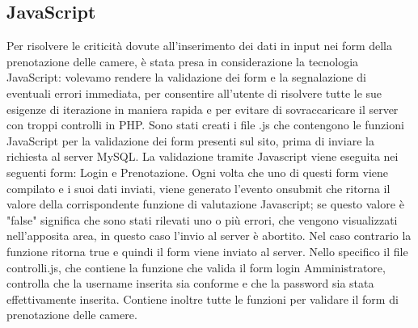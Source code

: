 \subsection{JavaScript}
Per risolvere le criticità dovute all'inserimento dei dati in input nei form della prenotazione delle camere, è stata presa in considerazione la tecnologia JavaScript: volevamo rendere la validazione dei form e la segnalazione di eventuali errori immediata, per consentire all'utente di risolvere tutte le sue esigenze di iterazione in maniera rapida e per evitare di sovraccaricare il server con troppi controlli in PHP.
Sono stati creati i file .js che contengono le funzioni JavaScript per la validazione dei form presenti sul sito, prima di inviare la richiesta al server MySQL. La validazione tramite Javascript viene eseguita nei seguenti form: Login e Prenotazione. Ogni volta che uno di questi form viene compilato e i suoi dati inviati, viene generato l'evento onsubmit che ritorna il valore della corrispondente funzione di valutazione Javascript; se questo valore è "false" significa che sono stati rilevati uno o più errori, che vengono visualizzati nell'apposita area, in questo caso l'invio al server è abortito. Nel caso contrario la funzione ritorna true e quindi il form viene inviato al server.
Nello specifico il file controlli.js, che contiene la funzione che valida il form login Amministratore, controlla che la username inserita sia conforme e che la password sia stata effettivamente inserita. Contiene inoltre tutte le funzioni per validare il form di prenotazione delle camere.
